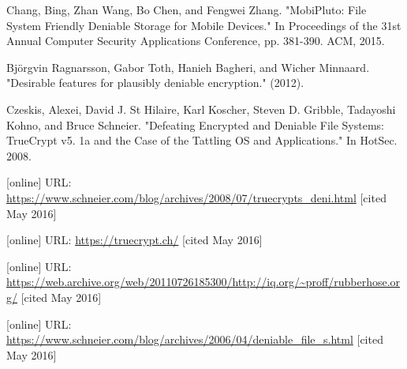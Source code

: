 \documentclass{acm_proc_article-sp}
\begin{document}
\begin{thebibliography}{13}

 Chang, Bing, Zhan Wang, Bo Chen, and Fengwei Zhang. "MobiPluto: File System Friendly Deniable Storage for Mobile Devices." In Proceedings of the 31st Annual Computer Security Applications Conference, pp. 381-390. ACM, 2015.

 Björgvin Ragnarsson, Gabor Toth, Hanieh Bagheri, and Wicher Minnaard. "Desirable features for plausibly deniable encryption." (2012).

 Czeskis, Alexei, David J. St Hilaire, Karl Koscher, Steven D. Gribble, Tadayoshi Kohno, and Bruce Schneier. "Defeating Encrypted and Deniable File Systems: TrueCrypt v5. 1a and the Case of the Tattling OS and Applications." In HotSec. 2008.

 [online] URL: \url{https://www.schneier.com/blog/archives/2008/07/truecrypts_deni.html} [cited May 2016]

 [online] URL: \url{https://truecrypt.ch/} [cited May 2016]

 [online] URL: \url{https://web.archive.org/web/20110726185300/http://iq.org/~proff/rubberhose.org/} [cited May 2016]

 [online] URL: \url{https://www.schneier.com/blog/archives/2006/04/deniable_file_s.html} [cited May 2016]

\end{thebibliography}

\end{document}
